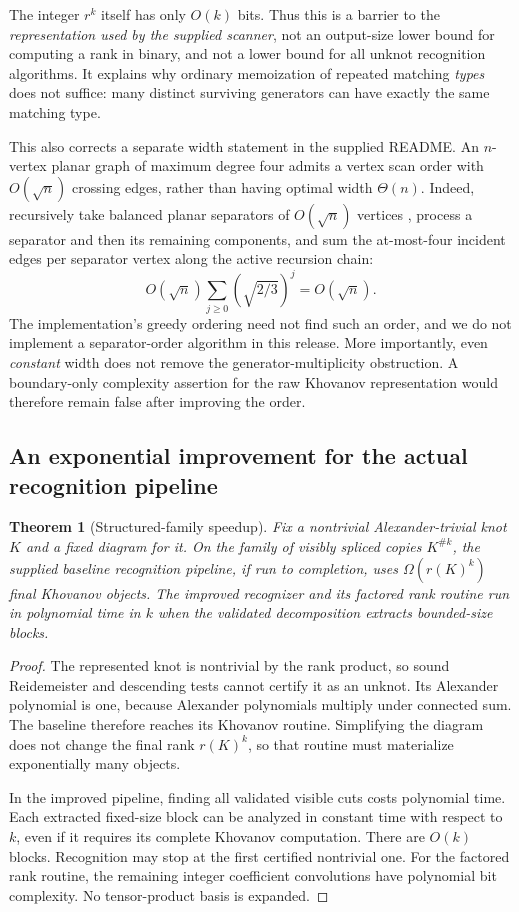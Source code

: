 \documentclass[11pt,a4paper]{article}
\newtheorem{theorem}{Theorem}[section]
\theoremstyle{definition}\newtheorem{remark}[theorem]{Remark}
\begin{document}
The integer $r^k$ itself has only $O(k)$ bits. Thus this is a barrier to the
\emph{representation used by the supplied scanner}, not an output-size lower
bound for computing a rank in binary, and not a lower bound for all unknot
recognition algorithms. It explains why ordinary memoization of repeated
matching \emph{types} does not suffice: many distinct surviving generators can
have exactly the same matching type.

This also corrects a separate width statement in the supplied README. An
$n$-vertex planar graph of maximum degree four admits a vertex scan order with
$O(\sqrt n)$ crossing edges, rather than having optimal width $\Theta(n)$.
Indeed, recursively take balanced planar separators of $O(\sqrt n)$ vertices
\cite{LiptonTarjan}, process a separator and then its remaining components, and
sum the at-most-four incident edges per separator vertex along the active
recursion chain:
\[
O(\sqrt n)\sum_{j\ge0}(\sqrt{2/3})^j=O(\sqrt n).
\]
The implementation's greedy ordering need not find such an order, and we do not
implement a separator-order algorithm in this release. More importantly, even
\emph{constant} width does not remove the generator-multiplicity obstruction.
A boundary-only complexity assertion for the raw Khovanov representation would
therefore remain false after improving the order.

\subsection{An exponential improvement for the actual recognition pipeline}
\begin{theorem}[Structured-family speedup]
Fix a nontrivial Alexander-trivial knot $K$ and a fixed diagram for it. On the
family of visibly spliced copies $K^{\#k}$, the supplied baseline recognition
pipeline, if run to completion, uses $\Omega(r(K)^k)$ final Khovanov objects.
The improved recognizer and its factored rank routine run in polynomial time
in $k$ when the validated decomposition extracts bounded-size blocks.
\end{theorem}
\begin{proof}
The represented knot is nontrivial by the rank product, so sound Reidemeister and
descending tests cannot certify it as an unknot. Its Alexander polynomial is
one, because Alexander polynomials multiply under connected sum. The baseline
therefore reaches its Khovanov routine. Simplifying the diagram does not change
the final rank $r(K)^k$, so that routine must materialize exponentially many
objects.

In the improved pipeline, finding all validated visible cuts costs polynomial
time. Each extracted fixed-size block can be analyzed in constant time with
respect to $k$, even if it requires its complete Khovanov computation. There
are $O(k)$ blocks. Recognition may stop at the first certified nontrivial one.
For the factored rank routine, the remaining integer coefficient convolutions
have polynomial bit complexity. No tensor-product basis is expanded.
\end{proof}
\end{document}
